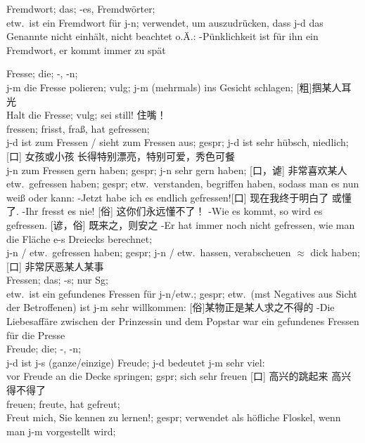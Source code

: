 \noindent
Fremdwort; das; -es, Fremdw\"orter; \\
etw.\ ist ein Fremdwort f\"ur j-n; verwendet, um auszudr\"ucken, dass j-d das Genannte nicht einh\"alt, nicht beachtet o.\"A.: -P\"unklichkeit ist f\"ur ihn ein Fremdwort, er kommt immer zu sp\"at

\noindent
Fresse; die; -, -n; \\
j-m die Fresse polieren; vulg; j-m (mehrmals) ins Gesicht schlagen; [粗]掴某人耳光\\
Halt die Fresse; vulg; sei still! 住嘴！\\

\noindent
fressen; frisst, fra\ss{}, hat gefressen; \\
j-d ist zum Fressen / sieht zum Fressen aus; gespr; j-d ist sehr h\"ubsch, niedlich; [口] 女孩或小孩 长得特别漂亮，特别可爱，秀色可餐 \\
j-n zum Fressen gern haben; gespr; j-n sehr gern haben; [口，谑] 非常喜欢某人\\
etw.\ gefressen haben; gespr; etw.\ verstanden, begriffen haben, sodass man es nun wei\ss{} oder kann: 
-Jetzt habe ich es endlich gefressen![口] 现在我终于明白了 或懂了.
-Ihr fresst es nie! [俗] 这你们永远懂不了！
-Wie es kommt, so wird es gefressen. [谚，俗] 既来之，则安之
-Er hat immer noch nicht gefressen, wie man die Fl\"ache e-s Dreiecks berechnet; \\
j-n / etw.\ gefressen haben; gespr; j-n / etw.\ hassen, verabscheuen $\approx$ dick haben; [口] 非常厌恶某人某事\\

\noindent
Fressen; das; -s; nur Sg;\\
etw.\ ist ein gefundenes Fressen f\"ur j-n/etw.; gespr;  etw.\ (mst Negatives aus Sicht der Betroffenen) ist j-m sehr willkommen: [俗]某物正是某人求之不得的 -Die Liebesaff\"are zwischen der Prinzessin und dem Popstar war ein gefundenes Fressen f\"ur die Presse \\

\noindent
Freude; die; -, -n; \\
j-d ist j-s (ganze/einzige) Freude; j-d bedeutet j-m sehr viel:\\
vor Freude an die Decke springen; gspr; sich sehr freuen [口] 高兴的跳起来 高兴得不得了\\

\noindent
freuen; freute, hat gefreut; \\
Freut mich, Sie kennen zu lernen!; gespr; verwendet als h\"ofliche Floskel, wenn man j-m vorgestellt wird;\\

